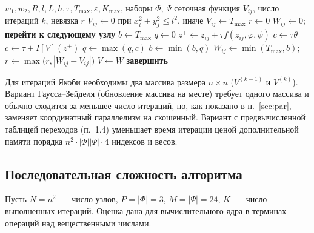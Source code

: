 \documentclass[14pt,a4paper]{extarticle}
\newcommand{\Tmax}{T_{\max}}
\begin{document}
\begin{algorithm}[H]
	\caption{Итерации по значению для полулагранжевой схемы (вариант Якоби)}
	\label{alg:vi}
	\begin{algorithmic}[1]
		\Require $w_1,w_2,R,l,L,h,\tau,\Tmax,\varepsilon,K_{\max}$, наборы $\Phi$, $\Psi$
		\Ensure сеточная функция $V_{ij}$, число итераций $k$, невязка $r$
		\State $V_{ij}\gets 0$ при $x_i^2+y_j^2\le l^2$, иначе $V_{ij}\gets\Tmax$
		\State $r\gets 0$
		 $W_{ij}\gets 0$; \textbf{перейти к следующему узлу}
		\EndIf
		\State $b\gets\Tmax$ 
		\For{$\varphi\in\Phi$}
		\State $q\gets 0$ 
		\For{$\psi\in\Psi$}
		\State $z^{+}\gets z_{ij}+\tau f(z_{ij},\varphi,\psi)$ 
		 
		\State $c\gets\tau\theta$
		\Else
		\State $c\gets\tau+I[V](z^{+})$ 
		\EndIf
		\State $q\gets\max(q,c)$ 
		\EndFor
		\State $b\gets\min(b,q)$ 
		\EndFor
		\State $W_{ij}\gets\min(\Tmax,b)$;\quad $r\gets\max\bigl(r,|W_{ij}-V_{ij}|\bigr)$ 
		\EndFor
		\State $V\gets W$
		 \textbf{завершить}
		\EndIf
		\EndFor
	\end{algorithmic}
\end{algorithm}

Для итераций Якоби необходимы два массива размера $n\times n$
($V^{(k-1)}$ и $V^{(k)}$). Вариант Гаусса--Зейделя (обновление
массива на месте) требует одного массива и обычно сходится за меньшее
число итераций, но, как показано в п.~\ref{sec:par}, заменяет
координатный параллелизм на скошенный. Вариант с предвычисленной
таблицей переходов (п.~1.4) уменьшает время итерации ценой
дополнительной памяти порядка $n^2\cdot|\Phi||\Psi|\cdot 4$ индексов и
весов.

\subsection{Последовательная сложность алгоритма}\label{sec:seq}

Пусть $N=n^2$~--- число узлов, $P=|\Phi|=3$, $M=|\Psi|=24$, $K$~--- число
выполненных итераций. Оценка дана для вычислительного ядра в терминах
операций над вещественными числами.
\end{document}
